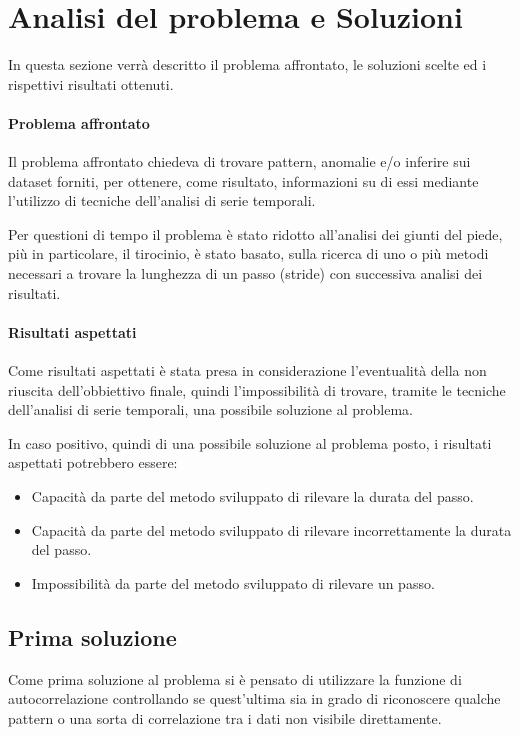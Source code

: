 \section{Analisi del problema e Soluzioni}
In questa sezione verrà descritto il problema affrontato, le soluzioni scelte ed i rispettivi
risultati ottenuti.

\paragraph{Problema affrontato}
Il problema affrontato chiedeva di trovare pattern, anomalie e/o inferire sui dataset forniti, 
per ottenere, come risultato, informazioni su di essi mediante l'utilizzo di tecniche 
dell'analisi di serie temporali.

Per questioni di tempo il problema è stato ridotto all'analisi dei giunti del piede, più in particolare,
il tirocinio, è stato basato, sulla ricerca di uno o più metodi necessari a trovare la lunghezza di un passo
(stride) con successiva analisi dei risultati.



\paragraph{Risultati aspettati}
\begin{sloppypar}
Come risultati aspettati è stata presa in considerazione l'eventualità della non riuscita dell'obbiettivo finale,
quindi l'impossibilità di trovare, tramite le tecniche dell'analisi di serie temporali, una possibile soluzione
al problema.
\end{sloppypar}

In caso positivo, quindi di una possibile soluzione al problema posto, i risultati aspettati potrebbero essere:
\begin{itemize}
    \setlength\itemsep{-0.5em}
    \item Capacità da parte del metodo sviluppato di rilevare la durata del passo.
    \item Capacità da parte del metodo sviluppato di rilevare incorrettamente la durata del passo.
    \item Impossibilità da parte del metodo sviluppato di rilevare un passo.
\end{itemize}


\subsection{Prima soluzione}
Come prima soluzione al problema si è pensato di utilizzare la funzione di autocorrelazione controllando
se quest'ultima sia in grado di riconoscere qualche pattern o una sorta di correlazione tra i dati non
visibile direttamente.

